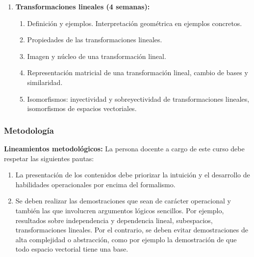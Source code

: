 \begin{refsection}
\begin{enumerate}
\item \textbf{Transformaciones lineales (4 semanas):} 
\begin{enumerate}
    \item Definición y ejemplos. Interpretación geométrica en ejemplos concretos.
    \item Propiedades de las transformaciones lineales. 
    \item Imagen y núcleo de una transformación lineal.
    \item Representación matricial de una transformación lineal, cambio de bases y similaridad.
    \item Isomorfismos: inyectividad y sobreyectividad de transformaciones lineales, isomorfismos de espacios vectoriales.
\end{enumerate}

\end{enumerate}

\subsubsection*{Metodología}

\noindent \textbf{Lineamientos metodológicos:} La persona docente a cargo de este curso debe respetar las siguientes pautas:
\begin{enumerate}
    \item La presentación de los contenidos debe priorizar la intuición y el desarrollo de habilidades operacionales por encima del formalismo. 
    \item Se deben realizar las demostraciones que sean de carácter operacional y también las que involucren argumentos lógicos sencillos. Por ejemplo, resultados sobre independencia y dependencia lineal, subespacios, transformaciones lineales. Por el contrario, se deben evitar demostraciones de alta complejidad o abstracción, como por ejemplo la demostración de que todo espacio vectorial tiene una base.
\end{enumerate}


\end{refsection}
